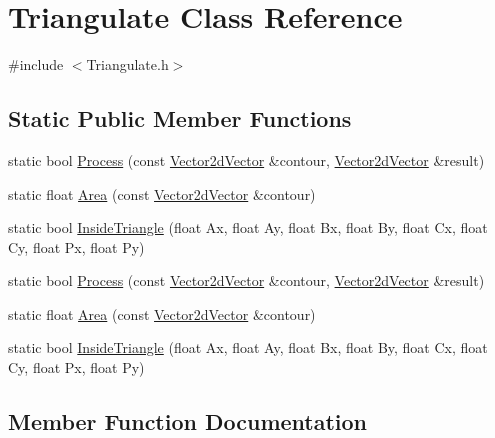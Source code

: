 \hypertarget{class_triangulate}{}\section{Triangulate Class Reference}
\label{class_triangulate}


{\ttfamily \#include $<$Triangulate.\+h$>$}

\subsection*{Static Public Member Functions}
\begin{DoxyCompactItemize}
\item 
static bool \hyperlink{class_triangulate_af4fac09e290332de51db7253ddd3af52}{Process} (const \hyperlink{_triangulate_2_triangulate_8h_a22f959cebca1771365bd10213e980cb7}{Vector2d\+Vector} \&contour, \hyperlink{_triangulate_2_triangulate_8h_a22f959cebca1771365bd10213e980cb7}{Vector2d\+Vector} \&result)
\item 
static float \hyperlink{class_triangulate_a6098773d8bf5ec229d7c1c147013230c}{Area} (const \hyperlink{_triangulate_2_triangulate_8h_a22f959cebca1771365bd10213e980cb7}{Vector2d\+Vector} \&contour)
\item 
static bool \hyperlink{class_triangulate_a4d97b17782d447791738c9a98dfa5788}{Inside\+Triangle} (float Ax, float Ay, float Bx, float By, float Cx, float Cy, float Px, float Py)
\item 
static bool \hyperlink{class_triangulate_a309367fe200406ae2bb200d84e1a6947}{Process} (const \hyperlink{_triangulate_2_triangulate_8h_a22f959cebca1771365bd10213e980cb7}{Vector2d\+Vector} \&contour, \hyperlink{_triangulate_2_triangulate_8h_a22f959cebca1771365bd10213e980cb7}{Vector2d\+Vector} \&result)
\item 
static float \hyperlink{class_triangulate_a6b62da0e9f86cd420be6a56ff47715fb}{Area} (const \hyperlink{_triangulate_2_triangulate_8h_a22f959cebca1771365bd10213e980cb7}{Vector2d\+Vector} \&contour)
\item 
static bool \hyperlink{class_triangulate_aff26272687d5a1c122ea2ab6692ffec9}{Inside\+Triangle} (float Ax, float Ay, float Bx, float By, float Cx, float Cy, float Px, float Py)
\end{DoxyCompactItemize}


\subsection{Member Function Documentation}
\hypertarget{class_triangulate_a6098773d8bf5ec229d7c1c147013230c}{}
